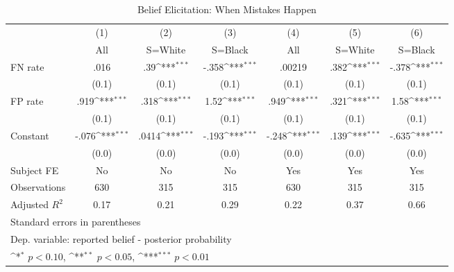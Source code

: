 \begin{table}[htbp]\centering
\def\sym#1{\ifmmode^{#1}\else\(^{#1}\)\fi}
\caption{Belief Elicitation: When Mistakes Happen}
\begin{tabular}{l*{6}{c}}
\hline\hline
                &\multicolumn{1}{c}{(1)}&\multicolumn{1}{c}{(2)}&\multicolumn{1}{c}{(3)}&\multicolumn{1}{c}{(4)}&\multicolumn{1}{c}{(5)}&\multicolumn{1}{c}{(6)}\\
                &\multicolumn{1}{c}{All}&\multicolumn{1}{c}{S=White}&\multicolumn{1}{c}{S=Black}&\multicolumn{1}{c}{All}&\multicolumn{1}{c}{S=White}&\multicolumn{1}{c}{S=Black}\\
\hline
FN rate         &     .016         &      .39\sym{***}&    -.358\sym{***}&   .00219         &     .382\sym{***}&    -.378\sym{***}\\
                &    (0.1)         &    (0.1)         &    (0.1)         &    (0.1)         &    (0.1)         &    (0.1)         \\
FP rate         &     .919\sym{***}&     .318\sym{***}&     1.52\sym{***}&     .949\sym{***}&     .321\sym{***}&     1.58\sym{***}\\
                &    (0.1)         &    (0.1)         &    (0.1)         &    (0.1)         &    (0.1)         &    (0.1)         \\
Constant        &    -.076\sym{***}&    .0414\sym{***}&    -.193\sym{***}&    -.248\sym{***}&     .139\sym{***}&    -.635\sym{***}\\
                &    (0.0)         &    (0.0)         &    (0.0)         &    (0.0)         &    (0.0)         &    (0.0)         \\
Subject FE      &       No         &       No         &       No         &      Yes         &      Yes         &      Yes         \\
\hline
Observations    &      630         &      315         &      315         &      630         &      315         &      315         \\
Adjusted \(R^{2}\)&     0.17         &     0.21         &     0.29         &     0.22         &     0.37         &     0.66         \\
\hline\hline
\multicolumn{7}{l}{\footnotesize Standard errors in parentheses}\\
\multicolumn{7}{l}{\footnotesize Dep. variable: reported belief - posterior probability}\\
\multicolumn{7}{l}{\footnotesize \sym{*} \(p<0.10\), \sym{**} \(p<0.05\), \sym{***} \(p<0.01\)}\\
\end{tabular}
\end{table}

